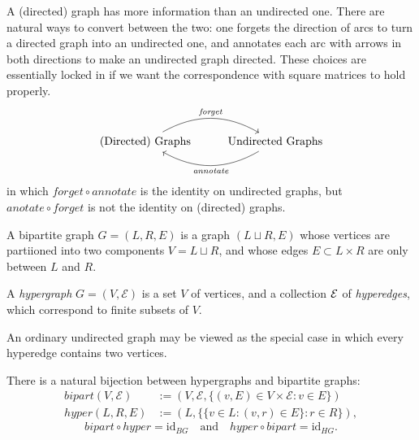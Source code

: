 A (directed) graph has more information than an undirected one.
There are natural ways to convert between the two: one forgets the direction of arcs to turn a directed graph into an undirected one, and annotates each arc with arrows in both directions to make an undirected graph directed. These choices are essentially locked in if we want the correspondence with square matrices to hold properly. 
\[ 
\begin{tikzcd}
\text{(Directed) Graphs} \ar[r,bend left,"\mathit{forget}"]&
\text{Undirected Graphs}
\ar[l,bend left,"\mathit{annotate}"]
\end{tikzcd}
\]
in which
$\mathit{forget} \circ \mathit{annotate}$
is the identity on undirected graphs, but
$\mathit{anotate} \circ \mathit{forget}$ is not the identity on (directed) graphs.

\begin{defn}
    A bipartite graph $G = (L, R, E)$ is a graph $(L \sqcup R, E)$ whose
    vertices are partiioned into two components $V = L \sqcup R$, 
    and whose edges $E \subset L \times R$ are only between $L$ and $R$. 
\end{defn}




\begin{defn}
    A \emph{hypergraph} $G = (V, \mathcal E)$ is a set $V$ of vertices,
    and a collection $\mathcal E$ of \emph{hyperedges}, which correspond to finite
    subsets of $V$. 
\end{defn}

An ordinary undirected graph may be viewed as the special case in which every hyperedge contains two vertices.

\begin{prop} 
There is a natural bijection between hypergraphs and bipartite graphs:
\def\bigr{\mathit{bipart}}
\def\hygr{\mathit{hyper}}
\begin{align*}
    \bigr(V, \mathcal E) &:=  (V, \mathcal E, \{(v, E) \in V \times \mathcal E : v \in E \} ) \\
    \hygr(L, R, E) &:= (L, \{\{v \in L : (v,r) \in E\} : r \in R\}),
\end{align*}    
    \[
        \bigr \circ \hygr = \mathrm{id}_{BG}
        \quad\text{and}\quad
        \hygr \circ \bigr = \mathrm{id}_{HG}.
    \]
\end{prop}


